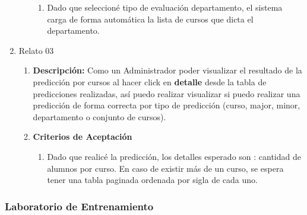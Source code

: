 \begin{enumerate}
\begin{enumerate}
\begin{enumerate}
					\item Dado que seleccioné tipo de evaluación departamento, el sistema carga de forma automática la lista de cursos que dicta el departamento.
				\end{enumerate}
		\end{enumerate}
	\item Relato 03
		\begin{enumerate}
			\item \textbf{Descripción:} Como un Administrador poder visualizar el resultado de la predicción por cursos al hacer click en \textbf{detalle} desde la tabla de predicciones realizadas, así puedo realizar visualizar si puedo realizar una predicción de forma correcta por tipo de predicción (curso, major, minor, departamento o conjunto de cursos).
			\item \textbf{Criterios de Aceptación}
				\begin{enumerate}
					\item Dado que realicé la predicción, los detalles esperado son : cantidad de alumnos por curso. En caso de existir más de un curso, se espera tener una tabla paginada ordenada por sigla de cada uno.
				\end{enumerate}
		\end{enumerate}
\end{enumerate}

\subsubsection{Laboratorio de Entrenamiento}

